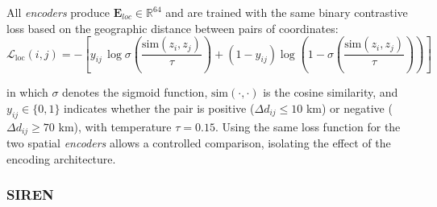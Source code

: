All \textit{encoders} produce $\mathbf{E}_{loc} \in \mathbb{R}^{64}$ and are
trained with the same binary contrastive loss based on the geographic distance between pairs of coordinates:
\begin{equation}
\mathcal{L}_{\text{loc}}(i,j)
=
- \left[
y_{ij}\,\log \sigma\!\left(\frac{\text{sim}(z_i,z_j)}{\tau}\right)
+
(1-y_{ij})
\log \left(1 - \sigma\!\left(\frac{\text{sim}(z_i,z_j)}{\tau}\right)\right)
\right]
\end{equation}

in which $\sigma$ denotes the sigmoid function, $\text{sim}(\cdot,\cdot)$ is the cosine similarity, and $y_{ij} \in \{0,1\}$ indicates whether the pair is positive ($\Delta d_{ij} \leq 10$ km) or negative ($\Delta d_{ij} \geq 70$ km), with temperature $\tau = 0.15$. Using the same loss function for the two spatial \textit{encoders} allows a controlled comparison, isolating the effect of the encoding architecture.





\subsubsection{SIREN}

